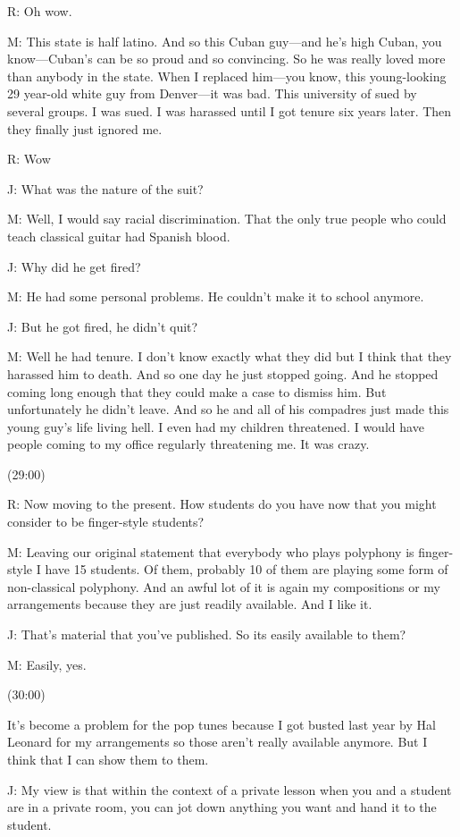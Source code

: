 \documentclass[11pt]{article}
\begin{document}
R: Oh wow.

M: This state is half latino. And so this Cuban guy—and he's high Cuban, you know—Cuban's can be so proud and so convincing. So he was really loved more than anybody in the state. When I replaced him—you know, this young-looking 29 year-old white guy from Denver—it was bad. This university of sued by several groups. I was sued. I was harassed until I got tenure six years later. Then they finally just ignored me. 

R: Wow

J: What was the nature of the suit?

M: Well, I would say racial discrimination. That the only true people who could teach classical guitar had Spanish blood. 

J: Why did he get fired?

M: He had some personal problems. He couldn't make it to school anymore. 

J: But he got fired, he didn't quit?

M: Well he had tenure. I don't know exactly what they did but I think that they harassed him to death. And so one day he just stopped going. And he stopped coming long enough that they could make a case to dismiss him. But unfortunately he didn't leave. And so he and all of his compadres just made this young guy's life living hell. I even had my children threatened. I would have people coming to my office regularly threatening me. It was crazy.

(29:00)

R: Now moving to the present. How students do you have now that you might consider to be finger-style students? 

M: Leaving our original statement that everybody who plays polyphony is finger-style I have 15 students. Of them, probably 10 of them are playing some form of non-classical polyphony. And an awful lot of it is again my compositions or my arrangements because they are just readily available. And I like it. 

J: That's material that you've published. So its easily available to them?

M: Easily, yes.

(30:00)

It's become a problem for the pop tunes because I got busted last year by Hal Leonard for my arrangements so those aren't really available anymore. But I think that I can show them to them.

J: My view is that within the context of a private lesson when you and a student are in a private room, you can jot down anything you want and hand it to the student. 
\end{document}
